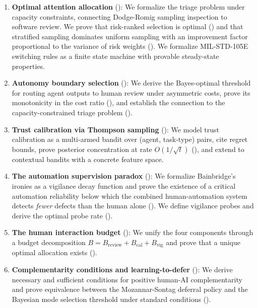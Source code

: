 \documentclass[11pt, a4paper, copyright]{googledeepmind}
\begin{document}
\begin{enumerate}[leftmargin=*]
\item \textbf{Optimal attention allocation} (): We formalize the triage problem under capacity constraints, connecting Dodge-Romig sampling inspection to software review. We prove that risk-ranked selection is optimal () and that stratified sampling dominates uniform sampling with an improvement factor proportional to the variance of risk weights (). We formalize MIL-STD-105E switching rules as a finite state machine with provable steady-state properties.

\item \textbf{Autonomy boundary selection} (): We derive the Bayes-optimal threshold for routing agent outputs to human review under asymmetric costs, prove its monotonicity in the cost ratio (), and establish the connection to the capacity-constrained triage problem ().

\item \textbf{Trust calibration via Thompson sampling} (): We model trust calibration as a multi-armed bandit over (agent, task-type) pairs, cite regret bounds, prove posterior concentration at rate $O(1/\sqrt{t})$ (), and extend to contextual bandits with a concrete feature space.

\item \textbf{The automation supervision paradox} (): We formalize Bainbridge's ironies as a vigilance decay function and prove the existence of a critical automation reliability below which the combined human-automation system detects \emph{fewer} defects than the human alone (). We define vigilance probes and derive the optimal probe rate ().

\item \textbf{The human interaction budget} (): We unify the four components through a budget decomposition $B = B_{\text{review}} + B_{\text{cal}} + B_{\text{vig}}$ and prove that a unique optimal allocation exists ().

\item \textbf{Complementarity conditions and learning-to-defer} (): We derive necessary and sufficient conditions for positive human-AI complementarity and prove equivalence between the Mozannar-Sontag deferral policy and the Bayesian mode selection threshold under standard conditions ().
\end{enumerate}
\end{document}
